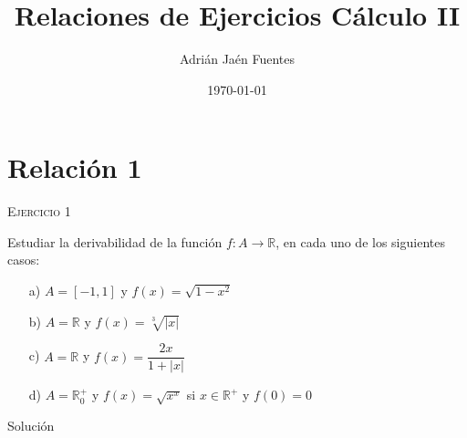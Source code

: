 \documentclass[12pt,a4paper]{article}
\begin{document}
	
\title{Relaciones de Ejercicios Cálculo II}
\author{Adrián Jaén Fuentes}
\date{\today}
\maketitle	
\tableofcontents

\newpage

\section{Relación 1}

\begin{center}
	\textsc{{\Large Ejercicio 1}}\\
\end{center}


Estudiar la derivabilidad de la función $f: A \rightarrow \mathbb{R}$, en cada uno de los siguientes casos:

\begin{enumerate}
	\item[a)] $A = [-1,1] $ y $f(x)=\sqrt{1-x^{2}}$
	\item[b)] $A = \mathbb{R} $ y $f(x)=\sqrt[3]{|x|}$
	\item[c)] $A = \mathbb{R} $ y $f(x)=\dfrac{2x}{1+|x|}$
	\item[d)] $A = \mathbb{R}_0^{+} $ y $f(x)=\sqrt{x^{x}}$ si $x \in \mathbb{R}^{+} $ y $f(0) = 0$\\
\end{enumerate}

\begin{center}
	{\Large Solución}\\
\end{center}
\end{document}
